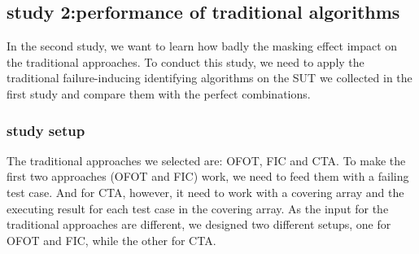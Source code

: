 \documentclass{sig-alternate}
\begin{document}
%
%

\subsection{study 2:performance of traditional algorithms}
In the second study, we want to learn how badly the masking effect impact on the traditional approaches. To conduct this study, we need to apply the traditional failure-inducing identifying algorithms on the SUT we collected in the first study and compare them with the perfect combinations. 


%


\subsubsection{study setup}
The traditional approaches we selected are: OFOT, FIC and CTA. To make the first two approaches (OFOT and FIC) work, we need to feed them with a failing test case. And for CTA, however, it need to work with a covering array and the executing result for each test case in the covering array. As the input for the traditional approaches are different, we designed two different setups, one for OFOT and FIC, while the other for CTA. 
\end{document}
